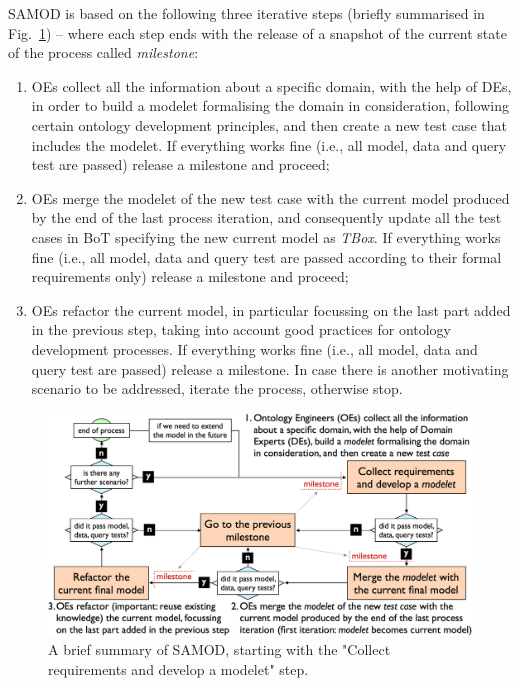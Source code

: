 \documentclass[runningheads,a4paper]{llncs}
\makeatletter
\def\maxwidth#1{\ifdim\Gin@nat@width>#1 #1\else\Gin@nat@width\fi}
\makeatother
\begin{document}
SAMOD is based on the following three iterative steps (briefly summarised in Fig.~\ref{refIllustration1}) -- where each step ends with the release of a snapshot of the current state of the process called {\em milestone}:
\begin{enumerate}
\item OEs collect all the information about a specific domain, with the help of DEs, in order to build a modelet formalising the domain in consideration, following certain ontology development principles, and then create a new test case that includes the modelet. If everything works fine (i.e., all model, data and query test are passed) release a milestone and proceed;
\item OEs merge the modelet of the new test case with the current model produced by the end of the last process iteration, and consequently update all the test cases in BoT specifying the new current model as {\em TBox}. If everything works fine (i.e., all model, data and query test are passed according to their formal requirements only) release a milestone and proceed;
\item OEs refactor the current model, in particular focussing on the last part added in the previous step, taking into account good practices for ontology development processes. If everything works fine (i.e., all model, data and query test are passed) release a milestone. In case there is another motivating scenario to be addressed, iterate the process, otherwise stop.
\end{enumerate}
\begin{figure}[h!]
\centering
\includegraphics[width=\maxwidth{\textwidth}]{img/10000201000008180000044441F74BCB.png}
\cprotect\caption{A brief summary of SAMOD, starting with the "Collect requirements and develop a modelet" step.}
\label{refIllustration1}
\end{figure}
\end{document}
